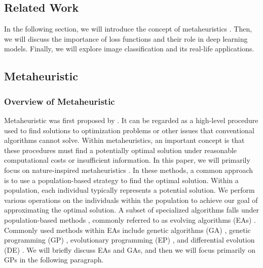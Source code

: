 \begin{ZhChapter}
    \chapter{Related Work}
    In the following section, we will introduce the concept of metaheuristics \cite{yang2010nature,yang2011metaheuristic} . Then, we will discuss the importance of loss functions and their role in deep learning \cite{deepLearning} models. Finally, we will explore image classification \cite{rawat2017deep} and its real-life applications.

    \section{Metaheuristic}
    \subsection{Overview of Metaheuristic}
    Metaheuristic \cite{glover1986future} was first proposed by \citeauthor{glover1986future}. It can be regarded as a high-level procedure used to find solutions to optimization problems or other issues that conventional algorithms cannot solve. Within metaheuristics, an important concept is that these procedures must find a potentially optimal solution under reasonable computational costs or insufficient information. In this paper, we will primarily focus on nature-inspired metaheuristics \cite{yang2010nature}. In these methods, a common approach is to use a population-based strategy to find the optimal solution. Within a population, each individual typically represents a potential solution. We perform various operations on the individuals within the population to achieve our goal of approximating the optimal solution. A subset of specialized algorithms falls under population-based methods \cite{enwiki:1255593755}, commonly referred to as evolving algorithms (EAs) \cite{muhlenbein1988evolution}. Commonly used methods within EAs include genetic algorithms (GA) \cite{kumar2010genetic}, genetic programming (GP) \cite{geneticProgramming} , evolutionary programming (EP) \cite{yao1999evolutionary}, and differential evolution (DE) \cite{das2010differential}. We will briefly discuss EAs and GAs, and then we will focus primarily on GPs in the following paragraph.


\end{ZhChapter}
